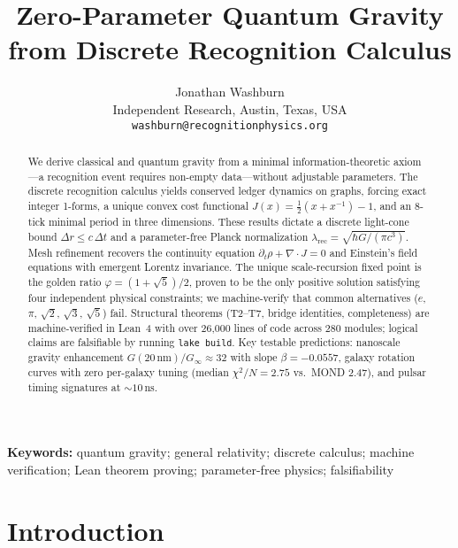 \documentclass[11pt]{article}
\begin{document}
\title{Zero-Parameter Quantum Gravity from Discrete Recognition Calculus}

\author{Jonathan Washburn\\
Independent Research, Austin, Texas, USA\\
\texttt{washburn@recognitionphysics.org}}
\date{}

\begin{abstract}
We derive classical and quantum gravity from a minimal information-theoretic axiom---a 
recognition event requires non-empty data---without adjustable parameters. 
The discrete recognition calculus yields conserved ledger dynamics on graphs, forcing 
exact integer 1-forms, a unique convex cost functional $J(x)=\tfrac{1}{2}(x+x^{-1})-1$, 
and an 8-tick minimal period in three dimensions. 
These results dictate a discrete light-cone bound $\Delta r \le c\,\Delta t$ and a 
parameter-free Planck normalization $\lambda_{\mathrm{rec}} = \sqrt{\hbar G/(\pi c^3)}$. 
Mesh refinement recovers the continuity equation $\partial_t\rho+\nabla\!\cdot\!J=0$ and 
Einstein's field equations with emergent Lorentz invariance. 
The unique scale-recursion fixed point is the golden ratio $\varphi=(1+\sqrt{5})/2$, 
proven to be the only positive solution satisfying four independent physical constraints; 
we machine-verify that common alternatives ($e$, $\pi$, $\sqrt{2}$, $\sqrt{3}$, $\sqrt{5}$) fail. 
Structural theorems (T2--T7, bridge identities, completeness) are machine-verified in Lean~4 
with over 26,000 lines of code across 280 modules; logical claims are falsifiable by running 
\texttt{lake build}. 
Key testable predictions: nanoscale gravity enhancement $G(20\,\mathrm{nm})/G_\infty\approx 32$ 
with slope $\beta=-0.0557$, galaxy rotation curves with zero per-galaxy tuning 
(median $\chi^2/N=2.75$ vs.~MOND 2.47), and pulsar timing signatures at $\sim\!10\,\mathrm{ns}$.
\end{abstract}

\maketitle

\noindent\textbf{Keywords:} quantum gravity; general relativity; discrete calculus; machine verification; Lean theorem proving; parameter-free physics; falsifiability

\section{Introduction}
\end{document}
